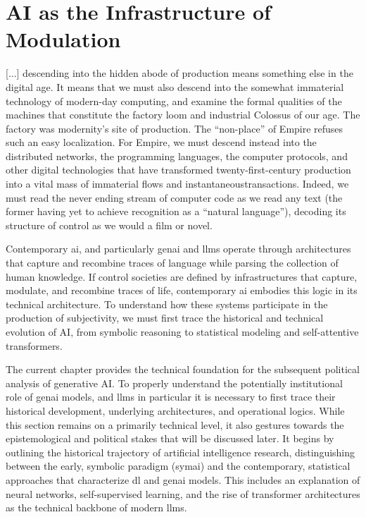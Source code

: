 \chapter{AI as the Infrastructure of Modulation}
\glsresetall

\epigraph{[...] descending into the hidden abode of production means something else in the digital age. It means that we must also descend into the somewhat immaterial technology of modern-day computing, and examine the formal qualities of the machines that constitute the factory loom and industrial Colossus of our age. The factory was modernity’s site of production. The “non-place” of Empire refuses such an easy localization. For Empire, we must descend instead into the distributed networks, the programming languages, the computer protocols, and other digital technologies that have transformed twenty-first-century production into a vital mass of immaterial flows and instantaneoustransactions. Indeed, we must read the never ending stream of computer code as we read any text (the former having yet to achieve recognition as a “natural language”), decoding its structure of control as we would a film or novel.}{\cite[82]{galloway2001}}


\greensquare

Contemporary \gls{ai}, and particularly \gls{genai} and \glspl{llm} operate through architectures that capture and recombine traces of language while parsing the collection of human knowledge. If control societies are defined by infrastructures that capture, modulate, and recombine traces of life, contemporary \gls{ai} embodies this logic in its technical architecture. To understand how these systems participate in the production of subjectivity, we must first trace the historical and technical evolution of AI, from symbolic reasoning to statistical modeling and self-attentive transformers.

The current chapter provides the technical foundation for the subsequent political analysis of generative AI. To properly understand the potentially institutional role of \gls{genai} models, and \glspl{llm} in particular it is necessary to first trace their historical development, underlying architectures, and operational logics. While this section remains on a primarily technical level, it also gestures towards the epistemological and political stakes that will be discussed later.
It begins by outlining the historical trajectory of artificial intelligence research, distinguishing between the early, symbolic paradigm (\gls{symai}) and the contemporary, statistical approaches that characterize \gls{dl}  and \gls{genai} models. This includes an explanation of neural networks, self-supervised learning, and the rise of transformer architectures as the technical backbone of modern \glspl{llm}.

